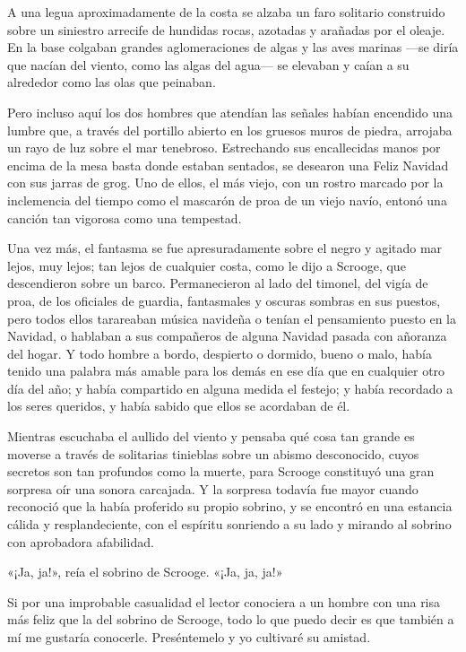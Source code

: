 \documentclass{novela}
\begin{document}
 A una legua aproximadamente de la costa se alzaba un faro solitario construido sobre un siniestro arrecife de hundidas rocas, azotadas y arañadas por el oleaje. En la base colgaban grandes aglomeraciones de algas y las aves marinas ---se diría que nacían del viento, como las algas del agua--- se elevaban y caían a su alrededor como las olas que peinaban.

 Pero incluso aquí los dos hombres que atendían las señales habían encendido una lumbre que, a través del portillo abierto en los gruesos muros de piedra, arrojaba un rayo de luz sobre el mar tenebroso. Estrechando sus encallecidas manos por encima de la mesa basta donde estaban sentados, se desearon una Feliz Navidad con sus jarras de grog. Uno de ellos, el más viejo, con un rostro marcado por la inclemencia del tiempo como el mascarón de proa de un viejo navío, entonó una canción tan vigorosa como una tempestad.

 Una vez más, el fantasma se fue apresuradamente sobre el negro y agitado mar lejos, muy lejos; tan lejos de cualquier costa, como le dijo a Scrooge, que descendieron sobre un barco. Permanecieron al lado del timonel, del vigía de proa, de los oficiales de guardia, fantasmales y oscuras sombras en sus puestos, pero todos ellos tarareaban música navideña o tenían el pensamiento puesto en la Navidad, o hablaban a sus compañeros de alguna Navidad pasada con añoranza del hogar. Y todo hombre a bordo, despierto o dormido, bueno o malo, había tenido una palabra más amable para los demás en ese día que en cualquier otro día del año; y había compartido en alguna medida el festejo; y había recordado a los seres queridos, y había sabido que ellos se acordaban de él.

 Mientras escuchaba el aullido del viento y pensaba qué cosa tan grande es moverse a través de solitarias tinieblas sobre un abismo desconocido, cuyos secretos son tan profundos como la muerte, para Scrooge constituyó una gran sorpresa oír una sonora carcajada. Y la sorpresa todavía fue mayor cuando reconoció que la había proferido su propio sobrino, y se encontró en una estancia cálida y resplandeciente, con el espíritu sonriendo a su lado y mirando al sobrino con aprobadora afabilidad.

 «¡Ja, ja!», reía el sobrino de Scrooge. «¡Ja, ja, ja!»

 Si por una improbable casualidad el lector conociera a un hombre con una risa más feliz que la del sobrino de Scrooge, todo lo que puedo decir es que también a mí me gustaría conocerle. Preséntemelo y yo cultivaré su amistad.
\end{document}
